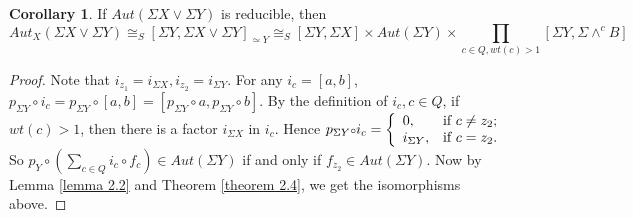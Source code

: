 \documentclass[12pt]{article}
\theoremstyle{theorem}
\theoremstyle{definition}
\theoremstyle{proposition}
\theoremstyle{corollary}
\newtheorem{corollary}[theorem]{Corollary}
\theoremstyle{lemma}
\theoremstyle{remark}
\theoremstyle{example}
\begin{document}
{\begin{corollary}\label{corollary2.5}
If $Aut(\Sigma X\vee \Sigma Y)$ is reducible,  then
$$Aut_{X}(\Sigma X\vee \Sigma Y)\cong_{S}[\Sigma Y, \Sigma X\vee \Sigma Y]_{\simeq Y}\cong_{S}[\Sigma Y, \Sigma X]\times Aut(\Sigma Y)\times\prod\limits_{c\in Q,wt(c)>1}[\Sigma Y, \Sigma \wedge^{c}B]$$
\end{corollary}
\begin{proof}
Note that $i_{z_{1}}=i_{\Sigma X}, i_{z_{2}}=i_{\Sigma Y}$. For any $i_{c}=[a,b]$, $p_{\Sigma Y}{\ensuremath{{\scriptstyle\circ}}} i_{c}=p_{\Sigma Y}{\ensuremath{{\scriptstyle\circ}}} [a,b]=[p_{\Sigma Y}{\ensuremath{{\scriptstyle\circ}}} a, p_{\Sigma Y}{\ensuremath{{\scriptstyle\circ}}} b]$. By the definition of $i_{c}, c\in Q$, if $wt(c)>1$, then there is a factor $i_{\Sigma X}$ in $i_{c}$. Hence $p_{\Sigma Y}{\ensuremath{{\scriptstyle\circ}}} i_{c}=\left\{
                                                                                  \begin{array}{ll}
                                                                                    0, & \hbox{if $c\neq z_{2}$;} \\
                                                                                    i_{\Sigma Y}, & \hbox{if $c= z_{2}$.}
                                                                                  \end{array}
                                                                                \right.$
 So $p_{Y}{\ensuremath{{\scriptstyle\circ}}}(\sum\limits_{c\in Q}i_{c}{\ensuremath{{\scriptstyle\circ}}} f_{c})\in Aut(\Sigma Y)$ if and only if $f_{z_{2}}\in Aut(\Sigma Y)$. Now by Lemma \ref{lemma 2.2} and Theorem \ref{theorem 2.4}, we get the isomorphisms above.
\end{proof}

}
\end{document}
